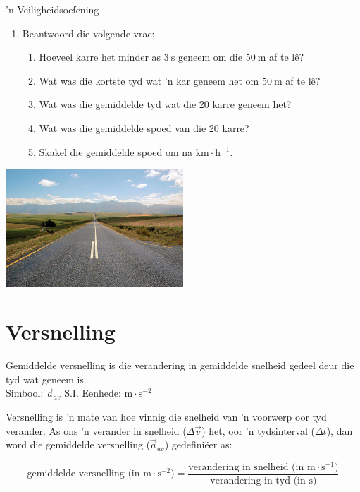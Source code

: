 \begin{Investigation}{ 'n Veiligheidsoefening}
\begin{enumerate}[noitemsep, label=\textbf{\arabic*}. ]
\item Beantwoord die volgende vrae:
\begin{enumerate}[noitemsep, label=\textbf{\alph*}. ] 
    \item Hoeveel karre het minder as $3~\text{s}$ geneem om die $50~\text{m}$ af te l\^e?
    \item Wat was die kortste tyd wat  'n kar geneem het om $50~\text{m}$ af te l\^e?
    \item Wat was die gemiddelde tyd wat die 20 karre geneem het?
    \item Wat was die gemiddelde spoed van die 20 karre?
    \item Skakel die gemiddelde spoed om na $\text{km}\ensuremath{\cdot}\text{h}{}^{-1}$.
\end{enumerate}
        \end{enumerate}
\begin{center}
\includegraphics[width=0.5\textwidth]{photos/roadby_cornstaruk_flickr.jpg}
\end{center}
\end{Investigation}



\section{Versnelling}
 {Gemiddelde versnelling is die verandering in gemiddelde snelheid gedeel deur die tyd wat geneem is.\\
Simbool: $\vec{a}_{av}$\hspace{2cm} S.I. Eenhede: $\text{m} \cdot \text{s}^{-2}$ } 

Versnelling is  'n mate van hoe vinnig  die snelheid van  'n voorwerp oor tyd verander. As ons  'n verander in snelheid ($\Delta \vec{v}$) het, oor  'n tydsinterval ($\Delta t$), dan word die gemiddelde versnelling ($\vec{a}_{av}$) gedefini\"eer as:

\begin{equation*}
    \text{gemiddelde versnelling (in m} \cdot {\text{s}}^{-2}\text{)} =\frac{\text{verandering in snelheid (in m} \cdot {\text{s}}^{-1}\text{)}}{\text{verandering in tyd (in s)}}
      \end{equation*}
        
